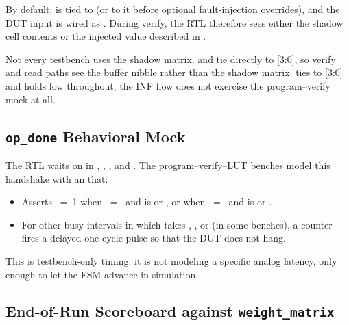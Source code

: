 By default,  is tied to
 (or to it before optional fault-injection
overrides), and the DUT input is wired as
. During verify, the
RTL therefore sees either the shadow cell contents or the injected
value described in .

Not every testbench uses the shadow matrix.
 and
 tie
 directly to [3:0], so
verify and read paths see the buffer nibble rather than the shadow
matrix.  ties
 to [3:0] and
holds  low throughout; the INF flow does not exercise
the program--verify mock at all.

\subsection{\texttt{op\_done} Behavioral Mock}
\label{sec:verif-mock-opdone}

The RTL waits on  in ,
, , and . The
program--verify--LUT benches model this handshake with an
 that:

\begin{itemize}
    \item Asserts ~=~1 when
          ~=~ and
           is  or
          , or when
          ~=~ and
           is  or
          .
    \item For other busy intervals in which  takes
          , , or
           (in some benches), a counter
           fires a delayed one-cycle pulse so
          that the DUT does not hang.
\end{itemize}

This is testbench-only timing: it is not modeling a specific analog
latency, only enough to let the FSM advance in simulation.

\subsection{End-of-Run Scoreboard against \texttt{weight\_matrix}}
\label{sec:verif-mock-scoreboard}


